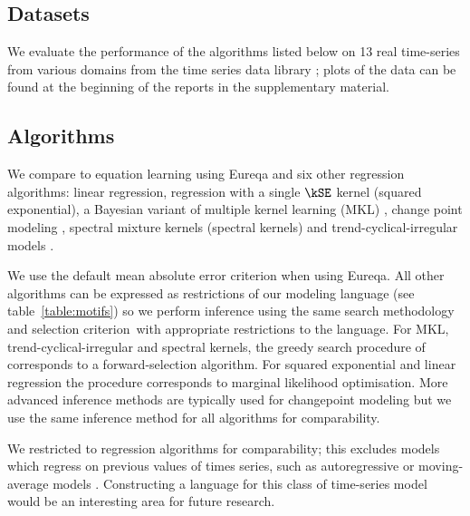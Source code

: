 


\subsection{Datasets}

We evaluate the performance of the algorithms listed below on 13 real time-series from various domains from the time series data library \citep{TSDL}; plots of the data can be found at the beginning of the reports in the supplementary material.



\subsection{Algorithms}

We compare \procedurename{} to equation learning using Eureqa \citep{Eureqa} and six other regression algorithms: linear regression, \gp{} regression with a single $\kSE$ kernel (squared exponential), a Bayesian variant of multiple kernel learning (MKL) \citep[e.g.][]{bach2004multiple}, change point modeling \citep[e.g.][]{garnett2010sequential, saatcci2010gaussian, FoxDunson:NIPS2012}, spectral mixture kernels \citep{WilAda13} (spectral kernels) and trend-cyclical-irregular models \citep[e.g.][]{lind2006basic}.

We use the default mean absolute error criterion when using Eureqa.
All other algorithms can be expressed as restrictions of our modeling language (see table~\ref{table:motifs}) so we perform inference using the same search methodology and selection criterion\footnotemark~with appropriate restrictions to the language.
For MKL, trend-cyclical-irregular and spectral kernels, the greedy search procedure of \procedurename{} corresponds to a forward-selection algorithm.
For squared exponential and linear regression the procedure corresponds to marginal likelihood optimisation.
More advanced inference methods are typically used for changepoint modeling but we use the same inference method for all algorithms for comparability.

We restricted to regression algorithms for comparability; this excludes models which regress on previous values of times series, such as autoregressive or moving-average models \citep[e.g.][]{box2013time}.
Constructing a language for this class of time-series model would be an interesting area for future research.



